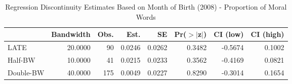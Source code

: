 \begin{table}[ht]
\centering
\begin{tabular}{lrrrrrrr}
  \hline
 & Bandwidth & Obs. & Est. & SE & Pr($>$$|$z$|$) & CI (low) & CI (high) \\ 
  \hline
LATE & 20.0000 & 90 & 0.0246 & 0.0262 & 0.3482 & -0.5674 & 0.1002 \\ 
  Half-BW & 10.0000 & 41 & 0.0215 & 0.0233 & 0.3562 & -0.4169 & 0.0821 \\ 
  Double-BW & 40.0000 & 175 & 0.0049 & 0.0227 & 0.8290 & -0.3014 & 0.1654 \\ 
   \hline
\end{tabular}
\caption{Regression Discontinuity Estimates Based on Month of Birth (2008) - Proportion of Moral Words} 
\label{tab:Xrd2008m2}
\end{table}

